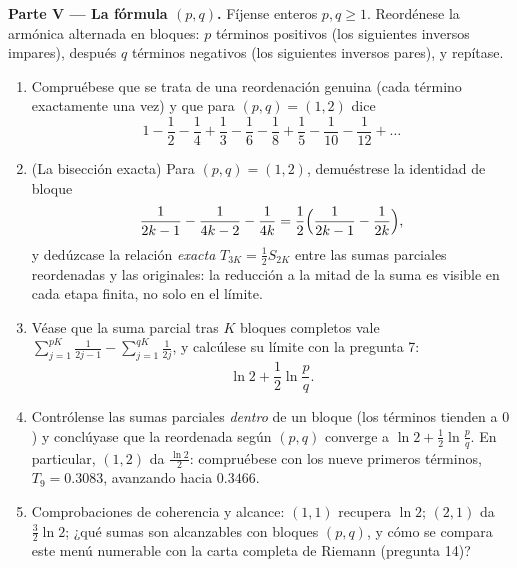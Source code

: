 \begin{problem}[{Problema del fin de semana --- $H_n = \ln n + \gamma +
\frac{1}{2n} + O(n^{-2})$, y la reordenación de
$1 - \frac12 + \frac13 - \dots$ hasta $\frac{\ln 2}{2}$}]
\medskip
\noindent\textbf{Parte V --- La fórmula $(p, q)$.} Fíjense enteros
$p, q \geq 1$. Reordénese la  armónica alternada en bloques:
$p$ términos positivos (los siguientes inversos impares), después $q$
términos negativos (los siguientes inversos pares), y repítase.
\begin{enumerate}[resume]
  \item Compruébese que se trata de una reordenación genuina (cada
        término exactamente una vez) y que para $(p, q) = (1, 2)$ dice
        \[
        1 - \frac12 - \frac14 + \frac13 - \frac16 - \frac18 +
        \frac15 - \frac1{10} - \frac1{12} + \dots
        \]
  \item (La bisección exacta) Para $(p, q) = (1, 2)$, demuéstrese la
        identidad de bloque
        \[
        \frac{1}{2k-1} - \frac{1}{4k-2} - \frac{1}{4k}
        = \frac12\Bigl(\frac{1}{2k-1} - \frac{1}{2k}\Bigr),
        \]
        y dedúzcase la relación \emph{exacta}
        $T_{3K} = \frac12 S_{2K}$ entre las sumas parciales
        reordenadas y las originales: la reducción a la mitad de la
        suma es visible en cada etapa finita, no solo en el límite.
  \item Véase que la suma parcial tras $K$ bloques completos vale
        $\sum_{j=1}^{pK} \frac{1}{2j-1} - \sum_{j=1}^{qK}
        \frac{1}{2j}$, y calcúlese su límite con la pregunta 7:
        \[
        \ln 2 + \frac12 \ln\frac pq .
        \]
  \item Contrólense las sumas parciales \emph{dentro} de un bloque
        (los términos tienden a $0$) y conclúyase que la 
        reordenada según $(p, q)$ converge a
        $\ln 2 + \frac12\ln \frac pq$. En particular, $(1, 2)$ da
        $\frac{\ln 2}{2}$: compruébese con los nueve primeros
        términos, $T_9 = 0.3083$, avanzando hacia $0.3466$.
  \item Comprobaciones de coherencia y alcance: $(1,1)$ recupera
        $\ln 2$; $(2,1)$ da $\frac32\ln 2$; ¿qué sumas son
        alcanzables con bloques $(p, q)$, y cómo se compara este
        menú numerable con la carta completa de Riemann
        (pregunta 14)?
\end{enumerate}


\end{problem}
